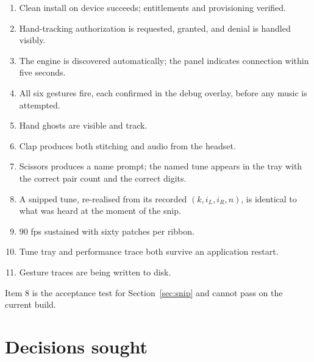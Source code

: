 \documentclass[11pt,a4paper]{article}
\theoremstyle{definition}
\theoremstyle{plain}
\theoremstyle{remark}
\begin{document}
\begin{enumerate}[leftmargin=*,itemsep=0.15em]
\item Clean install on device succeeds; entitlements and provisioning verified.
\item Hand-tracking authorization is requested, granted, and denial is handled visibly.
\item The engine is discovered automatically; the panel indicates connection within five seconds.
\item All six gestures fire, each confirmed in the debug overlay, before any music is attempted.
\item Hand ghosts are visible and track.
\item Clap produces both stitching and audio from the headset.
\item Scissors produces a name prompt; the named tune appears in the tray with the correct pair
      count and the correct digits.
\item A snipped tune, re-realised from its recorded $(k, i_L, i_R, n)$, is identical to what was
      heard at the moment of the snip.
\item 90 fps sustained with sixty patches per ribbon.
\item Tune tray and performance trace both survive an application restart.
\item Gesture traces are being written to disk.
\end{enumerate}

Item 8 is the acceptance test for Section~\ref{sec:snip} and cannot pass on the current build.

\section{Decisions sought}
\label{sec:decisions}
\end{document}
